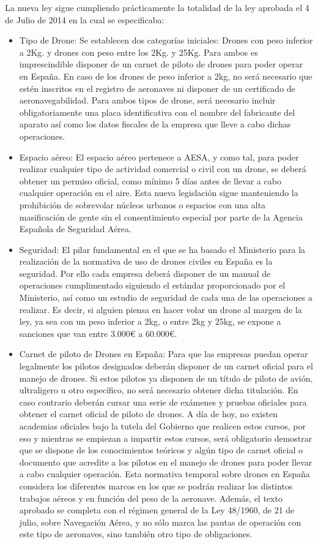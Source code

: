 \hspace{1cm} La nueva ley sigue cumpliendo prácticamente la totalidad de la ley aprobada el 4 de Julio de 2014 en la cual se especificaba: 
\begin{itemize}
		\item Tipo de Drone: Se establecen dos categorías iniciales: Drones con peso inferior a 2Kg. y drones con peso entre los 2Kg. y 25Kg. Para ambos es imprescindible disponer de un carnet de piloto de drones para poder operar en España. En caso de los drones de peso inferior a 2kg, no será necesario que estén inscritos en el registro de aeronaves ni disponer de un certificado de aeronavegabilidad. Para ambos tipos de drone, será necesario incluir obligatoriamente una placa identificativa con el nombre del fabricante del aparato así como los datos fiscales de la empresa que lleve a cabo dichas operaciones.
		\item Espacio aéreo: El espacio aéreo pertenece a AESA, y como tal, para poder realizar cualquier tipo de actividad comercial o civil con un drone, se deberá obtener un permiso oficial, como mínimo 5 días antes de llevar a cabo cualquier operación en el aire. Esta nueva legislación sigue manteniendo la prohibición de sobrevolar núcleos urbanos o espacios con una alta masificación de gente sin el consentimiento especial por parte de la Agencia Española de Seguridad Aérea.
		\item Seguridad: El pilar fundamental en el que se ha basado el Ministerio para la realización de la normativa de uso de drones civiles en España es la seguridad. Por ello cada empresa deberá disponer de un manual de operaciones cumplimentado siguiendo el estándar proporcionado por el Ministerio, así como un estudio de seguridad de cada una de las operaciones a realizar. Es decir, si alguien piensa en hacer volar un drone al margen de la ley, ya sea con un peso inferior a 2kg, o entre 2kg y 25kg, se expone a sanciones que van entre 3.000\textup{\euro} a 60.000\textup{\euro}.
		\item Carnet de piloto de Drones en España: Para que las empresas puedan operar legalmente los pilotos designados deberán disponer de un carnet oficial para el manejo de drones. Si estos pilotos ya disponen de un título de piloto de avión, ultraligero u otro específico, no será necesario obtener dicha titulación. En caso contrario deberán cursar una serie de exámenes y pruebas oficiales para obtener el carnet oficial de piloto de drones. A día de hoy, no existen academias oficiales bajo la tutela del Gobierno que realicen estos cursos, por eso y mientras se empiezan a impartir estos cursos, será obligatorio demostrar que se dispone de los conocimientos teóricos y algún tipo de carnet oficial o documento que acredite a los pilotos en el manejo de drones para poder llevar a cabo cualquier operación. Esta normativa temporal sobre drones en España considera los diferentes marcos en los que se podrán realizar los distintos trabajos aéreos y en función del peso de la aeronave. Además, el texto aprobado se completa con el régimen general de la Ley 48/1960, de 21 de julio, sobre Navegación Aérea, y no sólo marca las pautas de operación con este tipo de aeronaves, sino también otro tipo de obligaciones.
	\end{itemize}
	
